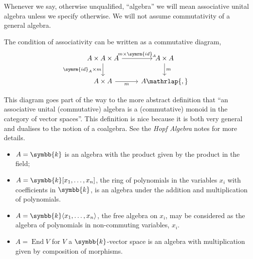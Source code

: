 \documentclass[fleqn]{NotesClass}
\renewcommand{\field}{\symbb{k}}
\newcommand{\id}{\symrm{id}}
\DeclareMathOperator{\End}{End}
\begin{document}
    Whenever we say, otherwise unqualified, \enquote{algebra} we will mean associative unital algebra unless we specify otherwise.
    We will not assume commutativity of a general algebra.
    
    The condition of associativity can be written as a commutative diagram,
    \begin{equation}
        \begin{tikzcd}
            A \times A \times A \arrow[r, "m \times \id_A"] \arrow[d, "\id_A \times m"'] & A \times A \arrow[d, "m"]\\
            A \times A \arrow[r, "m"'] & A\mathrlap{,}
        \end{tikzcd}
    \end{equation}
    
    \begin{remark}{}{}
        This diagram goes part of the way to the more abstract definition that \enquote{an associative unital (commutative) algebra is a (commutative) monoid in the category of vector spaces}.
        This definition is nice because it is both very general and dualises to the notion of a coalgebra.
        See the \textit{Hopf Algebra} notes for more details.
    \end{remark}
    
    \begin{exm}{}{}
        \begin{itemize}
            \item \(A = \field\) is an algebra with the product given by the product in the field;
            \item \(A = \field[x_1, \dotsc, x_n]\), the ring of polynomials in the variables \(x_i\) with coefficients in \(\field\), is an algebra under the addition and multiplication of polynomials.
            \item \(A = \field \langle x_1, \dotsc, x_n \rangle\), the free algebra on \(x_i\), may be considered as the algebra of polynomials in non-commuting variables, \(x_i\).
            \item \(A = \End V\) for \(V\) a \(\field\)-vector space is an algebra with multiplication given by composition of morphisms.
        \end{itemize}
    \end{exm}
    
\end{document}
